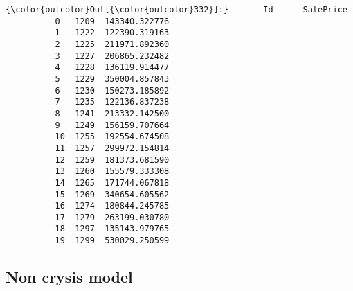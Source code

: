 \documentclass[11pt]{article}
\begin{document}
\begin{Verbatim}[commandchars=\\\{\}]
{\color{outcolor}Out[{\color{outcolor}332}]:}       Id      SalePrice
          0   1209  143340.322776
          1   1222  122390.319163
          2   1225  211971.892360
          3   1227  206865.232482
          4   1228  136119.914477
          5   1229  350004.857843
          6   1230  150273.185892
          7   1235  122136.837238
          8   1241  213332.142500
          9   1249  156159.707664
          10  1255  192554.674508
          11  1257  299972.154814
          12  1259  181373.681590
          13  1260  155579.333308
          14  1265  171744.067818
          15  1269  340654.605562
          16  1274  180844.245785
          17  1279  263199.030780
          18  1297  135143.979765
          19  1299  530029.250599
\end{Verbatim}
            
    \subsection{Non crysis model}\label{non-crysis-model}
\end{document}
